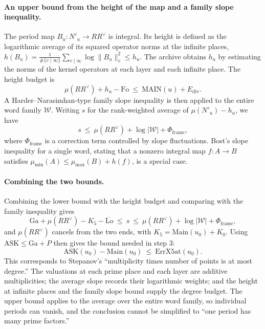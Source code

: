 \documentclass[11pt]{article}
\begin{document}
\paragraph{An upper bound from the height of the map and a family slope inequality.} The period map $B_u:N'_u\to RR^\vee$ is integral. Its height is defined as the logarithmic average of its squared operator norms at the infinite places, $h(B_u)=\frac1{\#\{v\mid\infty\}}\sum_{v\mid\infty}\log\|B_u\|_v^2\le h_u$. The archive obtains $h_u$ by estimating the norms of the kernel operators at each layer and each infinite place. The height budget is
\[
\mu(RR^\vee)+h_u-\mathrm{Fo}\ \le\ \mathrm{MAIN}(u)+E_{\mathrm{div}} .
\]
A Harder--Narasimhan-type family slope inequality is then applied to the entire word family $\mathcal W$. Writing $s$ for the rank-weighted average of $\mu(N'_u)-h_u$, we have
\[
s\ \le\ \mu(RR^\vee)+\log|\mathcal W|+\Phi_{\mathrm{frame}},
\]
where $\Phi_{\mathrm{frame}}$ is a correction term controlled by slope fluctuations. Bost's slope inequality for a single word, stating that a nonzero integral map $f:A\to B$ satisfies $\mu_{\min}(A)\le\mu_{\max}(B)+h(f)$, is a special case.

\paragraph{Combining the two bounds.} Combining the lower bound with the height budget and comparing with the family inequality gives
\[
\mathrm{Ga}+\mu(RR^\vee)-K_5-\overline{\mathrm{Lo}}\ \le\ s\ \le\ \mu(RR^\vee)+\log|\mathcal W|+\Phi_{\mathrm{frame}},
\]
and $\mu(RR^\vee)$ cancels from the two ends, with $K_5=\mathrm{Main}(u_0)+K_0$. Using $\mathrm{ASK}\le\mathrm{Ga}+P$ then gives the bound needed in step 3:
\[
\mathrm{ASK}(u_0)-\mathrm{Main}(u_0)\ \le\ \mathrm{ErrX5at}(u_0).
\]
This corresponds to Stepanov's ``multiplicity times number of points is at most degree.'' The valuations at each prime place and each layer are additive multiplicities; the average slope records their logarithmic weights; and the height at infinite places and the family slope bound supply the degree budget. The upper bound applies to the average over the entire word family, so individual periods can vanish, and the conclusion cannot be simplified to ``one period has many prime factors.''
\end{document}
